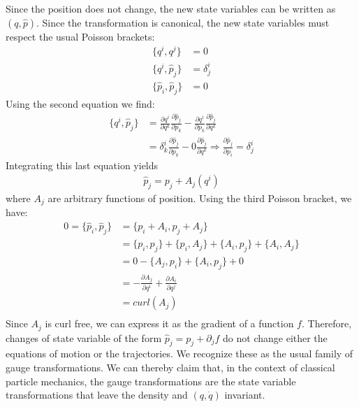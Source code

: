 \documentclass[letterpaper]{article}
\begin{document}
Since the position does not change, the new state variables can be written as $(q, \hat{p})$. Since the transformation is canonical, the new state variables must respect the usual Poisson brackets:
\begin{equation}
\begin{aligned}
	\{q^i, q^j\} &= 0 \\
	\{q^i, \hat{p}_j\} &= \delta^i_j \\
	\{\hat{p}_i, \hat{p}_j\} &= 0
\end{aligned}
\end{equation}
Using the second equation we find:
\begin{equation}
\begin{aligned}
	\{q^i, \hat{p}_j\} &= \frac{\partial q^i}{\partial q^k} \frac{\partial \hat{p}_j}{\partial p_k} - \frac{\partial q^i}{\partial p_k} \frac{\partial \hat{p}_j}{\partial q^k} \\
	&= \delta^i_k \frac{\partial \hat{p}_j}{\partial p_k} - 0 \frac{\partial \hat{p}_j}{\partial q^k} \Rightarrow \frac{\partial \hat{p}_j}{\partial p_i} = \delta^i_j
\end{aligned}
\end{equation}
Integrating this last equation yields
\begin{equation}
\begin{aligned}
\hat{p}_j = p_j + A_j(q^i)
\end{aligned}
\end{equation}
where $A_j$ are arbitrary functions of position. Using the third Poisson bracket, we have:
\begin{equation}
\begin{aligned}
0 = \{\hat{p}_i, \hat{p}_j\} &= \{p_i + A_i, p_j + A_j\} \\
&= \{p_i, p_j \} + \{p_i , A_j\} + \{A_i, p_j \} + \{A_i, A_j\} \\
&= 0 - \{A_j, p_i\} + \{A_i, p_j \} + 0 \\
&= - \frac{\partial A_j}{\partial q^i} + \frac{\partial A_i}{\partial q^j} \\
&= curl(A_j) \\
\end{aligned}
\end{equation}
Since $A_j$ is curl free, we can express it as the gradient of a function $f$. Therefore, changes of state variable of the form $\hat{p}_j = p_j + \partial_j f$ do not change either the equations of motion or the trajectories. We recognize these as the usual family of gauge transformations. We can thereby claim that, in the context of classical particle mechanics, the gauge transformations are the state variable transformations that leave the density and $(q,\dot{q}) $ invariant.
\end{document}
